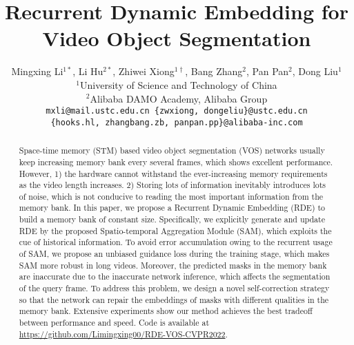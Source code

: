 \documentclass[10pt,twocolumn,letterpaper]{article}
\begin{document}
\title{Recurrent Dynamic Embedding for Video Object Segmentation}

\author{
Mingxing Li$^{1*}$,
Li Hu$^{2*}$,
Zhiwei Xiong$^{1\dag}$,
Bang Zhang$^{2}$,
Pan Pan$^{2}$,
Dong Liu$^{1}$
\\
$^1$University of Science and Technology of China \\
$^2$Alibaba DAMO Academy, Alibaba Group \\ 
{\tt\small mxli@mail.ustc.edu.cn \{zwxiong, dongeliu\}@ustc.edu.cn}\\
{\tt\small\{hooks.hl, zhangbang.zb, panpan.pp\}@alibaba-inc.com}
}
\maketitle

\begin{abstract}
\renewcommand{\thefootnote}{}
\vspace{-.5em}
Space-time memory (STM) based video object segmentation (VOS) networks usually keep increasing memory bank every several frames, which shows excellent performance. However, 1) the hardware cannot withstand the ever-increasing memory requirements as the video length increases. 2) Storing lots of information inevitably introduces lots of noise, which is not conducive to reading the most important information from the memory bank. In this paper, we propose a Recurrent Dynamic Embedding (RDE) to build a memory bank of constant size. Specifically, we explicitly generate and update RDE by the proposed Spatio-temporal Aggregation Module (SAM), which exploits the cue of historical information. To avoid error accumulation owing to the recurrent usage of SAM, we propose an unbiased guidance loss during the training stage, which makes SAM more robust in long videos. Moreover, the predicted masks in the memory bank are inaccurate due to the inaccurate network inference, which affects the segmentation of the query frame. To address this problem, we design a novel self-correction strategy so that the network can repair the embeddings of masks with different qualities in the memory bank. Extensive experiments show our method achieves the best tradeoff between performance and speed. Code is available 
at \url{https://github.com/Limingxing00/RDE-VOS-CVPR2022}.
\end{abstract}
\end{document}
